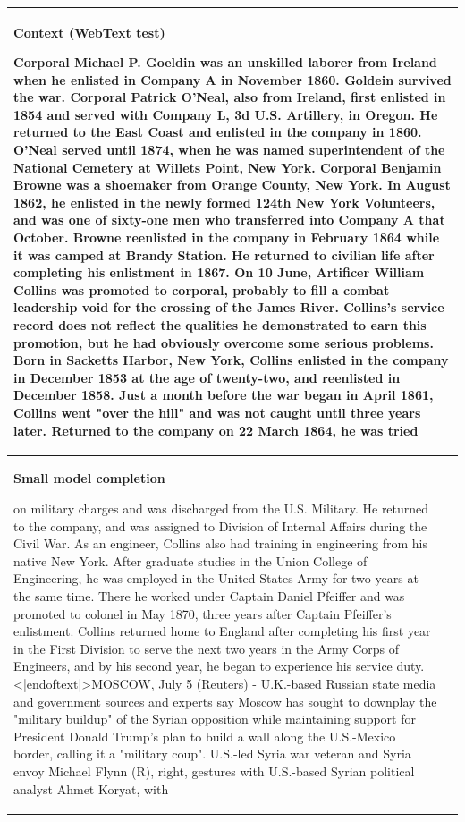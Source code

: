 \documentclass{article}
\begin{document}
\begin{table}[t]
\begin{center}
\begin{tabular}{|p{8cm}|p{8cm}|}

\hline
\multicolumn{2}{|C{16cm}|}{
\centerline{\textbf{Context (WebText test)}}
Corporal Michael P. Goeldin was an unskilled laborer from Ireland when he enlisted in Company A in November 1860. Goldein survived the war. Corporal Patrick O'Neal, also from Ireland, first enlisted in 1854 and served with Company L, 3d U.S. Artillery, in Oregon. He returned to the East Coast and enlisted in the company in 1860. O'Neal served until 1874, when he was named superintendent of the National Cemetery at Willets Point, New York. Corporal Benjamin Browne was a shoemaker from Orange County, New York. In August 1862, he enlisted in the newly formed 124th New York Volunteers, and was one of sixty-one men who transferred into Company A that October. Browne reenlisted in the company in February 1864 while it was camped at Brandy Station. He returned to civilian life after completing his enlistment in 1867. \newline\newline On 10 June, Artificer William Collins was promoted to corporal, probably to fill a combat leadership void for the crossing of the James River. Collins's service record does not reflect the qualities he demonstrated to earn this promotion, but he had obviously overcome some serious problems. Born in Sacketts Harbor, New York, Collins enlisted in the company in December 1853 at the age of twenty-two, and reenlisted in December 1858. Just a month before the war began in April 1861, Collins went "over the hill" and was not caught until three years later. Returned to the company on 22 March 1864, he was tried
} \\
\hline
\centerline{\textbf{Small model completion}}
 on military charges and was discharged from the U.S. Military. He returned to the company, and was assigned to Division of Internal Affairs during the Civil War.
\newline\newline
As an engineer, Collins also had training in engineering from his native New York. After graduate studies in the Union College of Engineering, he was employed in the United States Army for two years at the same time. There he worked under Captain Daniel Pfeiffer and was promoted to colonel in May 1870, three years after Captain Pfeiffer's enlistment. Collins returned home to England after completing his first year in the First Division to serve the next two years in the Army Corps of Engineers, and by his second year, he began to experience his service duty.<|endoftext|>MOSCOW, July 5 (Reuters) - U.K.-based Russian state media and government sources and experts say Moscow has sought to downplay the "military buildup" of the Syrian opposition while maintaining support for President Donald Trump's plan to build a wall along the U.S.-Mexico border, calling it a "military coup".
\newline\newline
U.S.-led Syria war veteran and Syria envoy Michael Flynn (R), right, gestures with U.S.-based Syrian political analyst Ahmet Koryat, with


\end{tabular}
\end{center}
\end{table}
\end{document}
